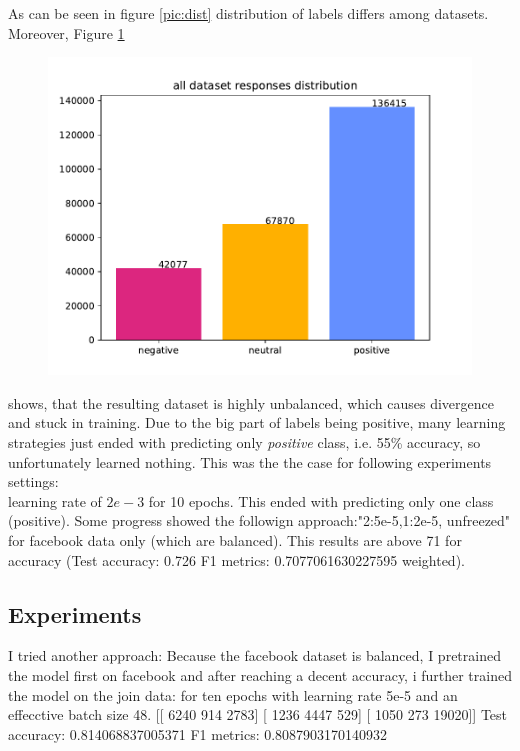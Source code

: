 As can be seen in figure \ref{pic:dist}
distribution of labels differs among datasets. Moreover, Figure \ref{pic:dist_all}
\begin{figure}[h]
\centering
\includegraphics[width=1\columnwidth]{../img/distribution_all}
\protect\caption{}
\label{pic:dist_all}
\end{figure}
shows, that the resulting dataset is highly unbalanced, which causes divergence and stuck in training. Due to the big part of labels being positive, many learning strategies just ended with predicting only \textit{positive} class, i.e. 55\% accuracy, so unfortunately learned nothing. This was the the case for following experiments settings:
\\
learning rate of $2e-3$ for 10 epochs. This ended with predicting only one class (positive). Some progress showed the followign approach:"2:5e-5,1:2e-5, unfreezed" for facebook data only (which are balanced). This results are above 71 for accuracy (Test accuracy: 0.726
F1 metrics: 0.7077061630227595 weighted).


\subsection{Experiments}
I tried another approach:
Because the facebook dataset is balanced, I pretrained the model first on facebook and after reaching a decent accuracy, i further trained the model on the join data:
for ten epochs with learning rate 5e-5 and an effecctive batch size 48.
[[ 6240 914 2783]
[ 1236 4447 529]
[ 1050 273 19020]]
Test accuracy: 0.814068837005371
F1 metrics: 0.8087903170140932

